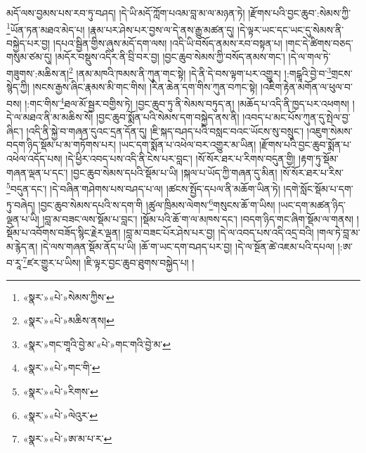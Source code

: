 མདོ་ལས་བྱམས་པས་རབ་ཏུ་བཤད། །དེ་ཡི་མདོ་ཀློག་པའམ་བླ་མ་ལ་མཉན་ཏེ། །རྫོགས་པའི་བྱང་ཆུབ་:སེམས་ཀྱི་\footnote{«སྣར་»«པེ་»སེམས་ཀྱིས་}ཡོན་ཏན་མཐའ་མེད་པ། །རྣམ་པར་ཤེས་པར་བྱས་ལ་དེ་ནས་རྒྱུ་མཚན་དུ། །དེ་ལྟར་ཡང་དང་ཡང་དུ་སེམས་ནི་བསྐྱེད་པར་བྱ། །དཔའ་སྦྱིན་གྱིས་ཞུས་མདོ་དག་ལས། །འདི་ཡི་བསོད་ནམས་རབ་བསྟན་པ། །གང་དེ་ཚིགས་བཅད་གསུམ་ཙམ་དུ། །མདོར་བསྡུས་འདིར་ནི་བྲི་བར་བྱ། །བྱང་ཆུབ་སེམས་ཀྱི་བསོད་ནམས་གང་། །དེ་ལ་གལ་ཏེ་གཟུགས་:མཆིས་ན།\footnote{«སྣར་»«པེ་»མཆིས་ནས།} །ནམ་མཁའི་ཁམས་ནི་ཀུན་གང་སྟེ། །དེ་ནི་དེ་བས་ལྟག་པར་འགྱུར། །:གངྒཱའི་བྱེ་བ་\footnote{«སྣར་»གང་གཱའི་བྱེ་མ་«པེ་»གང་གའི་བྱེ་མ་}གྲངས་སྙེད་ཀྱི། །སངས་རྒྱས་ཞིང་རྣམས་མི་གང་གིས། །རིན་ཆེན་དག་གིས་ཀུན་བཀང་སྟེ། །འཇིག་རྟེན་མགོན་ལ་ཕུལ་བ་བས། །:གང་གིས་\footnote{«སྣར་»«པེ་»གང་གི་}ཐལ་མོ་སྦྱར་བགྱིས་ཏེ། །བྱང་ཆུབ་ཏུ་ནི་སེམས་བཏུད་ན། །མཆོད་པ་འདི་ནི་ཁྱད་པར་འཕགས། །དེ་ལ་མཐའ་ནི་མ་མཆིས་སོ། །བྱང་ཆུབ་སྨོན་པའི་སེམས་དག་བསྐྱེད་ནས་ནི། །འབད་པ་མང་པོས་ཀུན་དུ་སྤེལ་བྱ་ཞིང་། །འདི་ནི་སྐྱེ་བ་གཞན་དུའང་དྲན་དོན་དུ། །ཇི་སྐད་བཤད་པའི་བསླང་བའང་ཡོངས་སུ་བསྲུང་། །འཇུག་སེམས་བདག་ཉིད་སྡོམ་པ་མ་གཏོགས་པར། །ཡང་དག་སྨོན་པ་འཕེལ་བར་འགྱུར་མ་ཡིན། །རྫོགས་པའི་བྱང་ཆུབ་སྨོན་པ་འཕེལ་འདོད་པས། །དེ་ཕྱིར་འབད་པས་འདི་ནི་ངེས་པར་བླང་། །སོ་སོར་ཐར་པ་རིགས་བདུན་གྱི། །རྟག་ཏུ་སྡོམ་གཞན་ལྡན་པ་དང་། །བྱང་ཆུབ་སེམས་དཔའི་སྡོམ་པ་ཡི། །སྐལ་པ་ཡོད་ཀྱི་གཞན་དུ་མིན། །སོ་སོར་ཐར་པ་རིས་\footnote{«སྣར་»«པེ་»རིགས་}བདུན་དང་། །དེ་བཞིན་གཤེགས་པས་བཤད་པ་ལ། །ཚངས་སྤྱོད་དཔལ་ནི་མཆོག་ཡིན་ཏེ། །དགེ་སློང་སྡོམ་པ་དག་ཏུ་བཞེད། །བྱང་ཆུབ་སེམས་དཔའི་ས་དག་གི །ཚུལ་ཁྲིམས་ལེགས་\footnote{«སྣར་»«པེ་»ལེའུར་}གསུངས་ཆོ་ག་ཡིས། །ཡང་དག་མཚན་ཉིད་ལྡན་པ་ཡི། །བླ་མ་བཟང་ལས་སྡོམ་པ་བླང་། །སྡོམ་པའི་ཆོ་ག་ལ་མཁས་དང་། །བདག་ཉིད་གང་ཞིག་སྡོམ་ལ་གནས། །སྡོམ་པ་འབོགས་བཟོད་སྙིང་རྗེར་ལྡན། །བླ་མ་བཟང་པོར་ཤེས་པར་བྱ། །དེ་ལ་འབད་པས་འདི་འདྲ་བའི། །གལ་ཏེ་བླ་མ་མ་རྙེད་ན། །དེ་ལས་གཞན་སྡོམ་ནོད་པ་ཡི། །ཆོ་ག་ཡང་དག་བཤད་པར་བྱ། །དེ་ལ་སྔོན་ཚེ་འཇམ་པའི་དཔལ། །:ཨ་བ་རཱ་\footnote{«སྣར་»«པེ་»ཨ་མ་པ་ར་}ཛར་གྱུར་པ་ཡིས། །ཇི་ལྟར་བྱང་ཆུབ་ཐུགས་བསྐྱེད་པ། །
